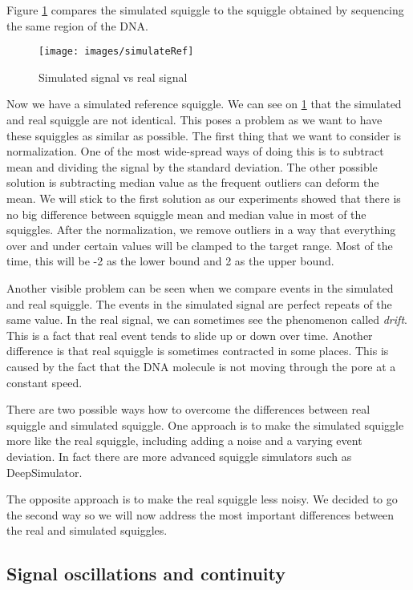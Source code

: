 Figure \ref{obr:simVsReal} compares the simulated squiggle to the squiggle obtained
by sequencing the same region of the DNA.

\begin{figure}
\centerline{\texttt{[image: images/simulateRef]}}
\caption[TODO]{Simulated signal vs real signal}
\label{obr:simVsReal}
\end{figure}

Now we have a simulated reference squiggle. We can see on \ref{obr:simVsReal} that the simulated and real
squiggle are not identical. This poses a problem as we want to have these squiggles as
similar as possible. The first thing that we want to consider is normalization.
One of the most wide-spread ways of doing this is to subtract mean and dividing
the signal by the standard deviation. The other possible solution is subtracting median value
as the frequent outliers can deform the mean. We will stick to the first solution
as our experiments showed that there is no big difference between squiggle mean
and median value in most of the squiggles.
After the normalization, we remove outliers in a way that everything over and under certain values will
be clamped to the target range. Most of the time, this will be -2 as the lower bound
and 2 as the upper bound.

Another visible problem can be seen when we compare events in the simulated and real squiggle.
The events in the simulated signal are perfect repeats of the same value. In the real signal, we can sometimes see
the phenomenon called \textit{drift}. This is a fact that real event tends to slide
up or down over time. Another difference is that real squiggle
is sometimes contracted in some places. This is caused by the fact that the DNA
molecule is not moving through the pore at a constant speed.

There are two possible ways how to overcome the differences between real squiggle
and simulated squiggle. One approach is to make the simulated squiggle more like
the real squiggle, including adding a noise and a varying event deviation. In fact there
are more advanced squiggle simulators such as DeepSimulator\cite{deepsimulator}.

The opposite approach is to make the real squiggle less noisy. We decided to go the
second way so we will now address the most important differences between the
real and simulated squiggles.

\subsection{Signal oscillations and continuity}
\label{subsection:oscillations}


